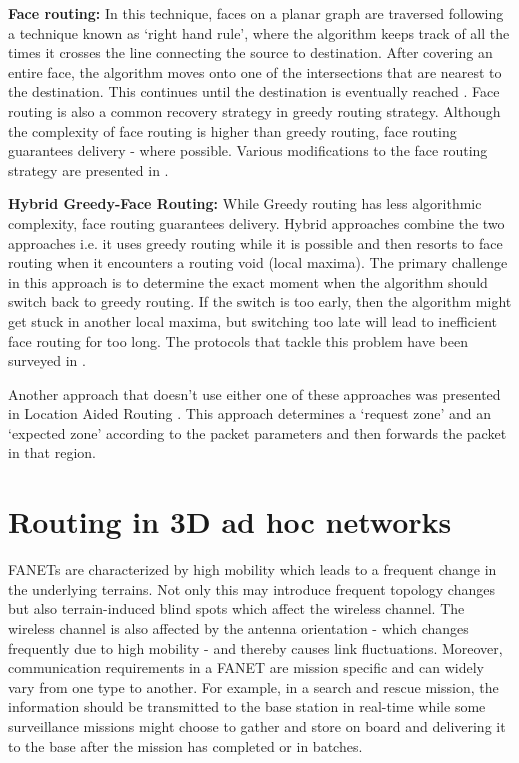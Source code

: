 \textbf{Face routing:} In this technique, faces on a planar graph are traversed following a technique known as `right hand rule', where the algorithm keeps track of all the times it crosses the line connecting the source to destination. After covering an entire face, the algorithm moves onto one of the intersections that are nearest to the destination. This continues until the destination is eventually reached \cite{4448977} \cite{6238283}. Face routing is also a common recovery strategy in greedy routing strategy. Although the complexity of face routing is higher than greedy routing, face routing guarantees delivery - where possible. Various modifications to the face routing strategy are presented in \cite{6238283}.

\textbf{Hybrid Greedy-Face Routing:} While Greedy routing has less algorithmic complexity, face routing guarantees delivery. Hybrid approaches combine the two approaches i.e. it uses greedy routing while it is possible and then resorts to face routing when it encounters a routing void (local maxima). The primary challenge in this approach is to determine the exact moment when the algorithm should switch back to greedy routing. If the switch is too early, then the algorithm might get stuck in another local maxima, but switching too late will lead to inefficient face routing for too long. The protocols that tackle this problem have been surveyed in \cite{6238283}.

Another approach that doesn't use either one of these approaches was presented in Location Aided Routing \cite{Ko:1998:LRM:288235.288252}. This approach determines a `request zone' and an `expected zone' according to the packet parameters and then forwards the packet in that region.

\section{Routing in 3D ad hoc networks}

FANETs are characterized by high mobility which leads to a frequent change in the underlying terrains. Not only this may introduce frequent topology changes but also terrain-induced blind spots which affect the wireless channel. The wireless channel is also affected by the antenna orientation - which changes frequently due to high mobility - and thereby causes link fluctuations. Moreover, communication requirements in a FANET are mission specific and can widely vary from one type to another. For example, in a search and rescue mission, the information should be transmitted to the base station in real-time while some surveillance missions might choose to gather and store on board and delivering it to the base after the mission has completed or in batches.

